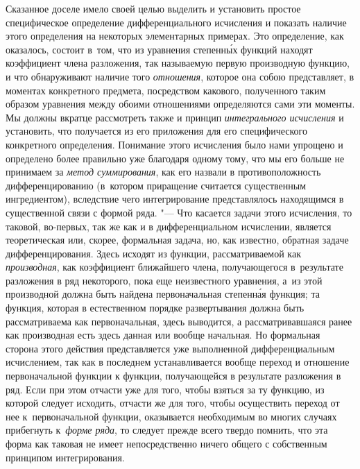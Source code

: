 Сказанное доселе имело своей целью выделить и установить простое специфическое
определение дифференциального исчисления и показать наличие этого определения
на некоторых элементарных примерах. Это определение, как оказалось, состоит
в~том, что из уравнения степенн\'{ы}х функций находят коэффициент члена разложения,
так называемую первую производную функцию, и что обнаруживают наличие того
{\em отношения}, которое она собою представляет, в моментах конкретного
предмета, посредством какового, полученного таким образом уравнения между
обоими отношениями определяются сами эти моменты. Мы должны вкратце рассмотреть
также и принцип {\em интегрального исчисления} и установить, что получается из
его приложения для его специфического конкретного определения. Понимание этого
исчисления было нами упрощено и определено более правильно уже благодаря одному
тому, что мы его больше не принимаем за {\em метод суммирования}, как его
назвали в противоположность дифференцированию (в~котором приращение считается
существенным ингредиентом), вследствие чего интегрирование представлялось
находящимся в существенной связи с формой ряда. "--- Что касается задачи этого
исчисления, то таковой, во-первых, так же как и в дифференциальном исчислении,
является теоретическая или, скорее, формальная задача, но, как известно,
обратная задаче дифференцирования. Здесь исходят из функции, рассматриваемой
как {\em производная}, как коэффициент ближайшего члена, получающегося
в~результате разложения в ряд некоторого, пока еще неизвестного уравнения, а~из
этой производной должна быть найдена первоначальная степенн\'{а}я функция; та
функция, которая в естественном \label{bkm:bm53b}порядке развертывания должна
быть рассматриваема как первоначальная, здесь выводится, а рассматривавшаяся
ранее как производная есть здесь данная или вообще начальная. Но формальная
сторона этого действия представляется уже выполненной дифференциальным
исчислением, так как в последнем устанавливается вообще переход и отношение
первоначальной функции к функции, получающейся в результате разложения в ряд.
Если при этом отчасти уже для того, чтобы взяться за ту функцию, из которой
следует исходить, отчасти же для того, чтобы осуществить переход от нее
к~первоначальной функции, оказывается необходимым во многих случаях прибегнуть
к~{\em форме ряда}, то следует прежде всего твердо помнить, что эта форма как
таковая не имеет непосредственно ничего общего с собственным принципом
интегрирования.

